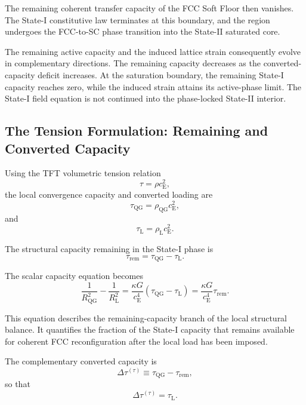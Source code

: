 The remaining coherent transfer capacity of the FCC Soft Floor then vanishes. The State-I constitutive law terminates at this boundary, and the region undergoes the FCC-to-SC phase transition into the State-II saturated core.

The remaining active capacity and the induced lattice strain consequently evolve in complementary directions. The remaining capacity decreases as the converted-capacity deficit increases. At the saturation boundary, the remaining State-I capacity reaches zero, while the induced strain attains its active-phase limit. The State-I field equation is not continued into the phase-locked State-II interior.

\subsection{The Tension Formulation: Remaining and Converted Capacity}

Using the TFT volumetric tension relation
\begin{equation}
    \tau = \rho c_{\mathrm{E}}^2,
\end{equation}
the local convergence capacity and converted loading are
\begin{equation}
    \tau_{\mathrm{QG}} = \rho_{\mathrm{QG}}c_{\mathrm{E}}^2,
\end{equation}
and
\begin{equation}
    \tau_{\mathrm{L}} = \rho_{\mathrm{L}}c_{\mathrm{E}}^2.
\end{equation}

The structural capacity remaining in the State-I phase is
\begin{equation}
    \tau_{\mathrm{rem}} = \tau_{\mathrm{QG}} - \tau_{\mathrm{L}}.
\end{equation}

The scalar capacity equation becomes
\begin{equation}
    \frac{1}{R_{\mathrm{QG}}^2} - \frac{1}{R_{\mathrm{L}}^2} = \frac{\kappa G}{c_{\mathrm{E}}^4} \left( \tau_{\mathrm{QG}} - \tau_{\mathrm{L}} \right) = \frac{\kappa G}{c_{\mathrm{E}}^4} \tau_{\mathrm{rem}}.
\end{equation}

This equation describes the remaining-capacity branch of the local structural balance. It quantifies the fraction of the State-I capacity that remains available for coherent FCC reconfiguration after the local load has been imposed.

The complementary converted capacity is
\begin{equation}
    \Delta\tau^{(\tau)} \equiv \tau_{\mathrm{QG}} - \tau_{\mathrm{rem}},
\end{equation}
so that
\begin{equation}
    \Delta\tau^{(\tau)} = \tau_{\mathrm{L}}.
\end{equation}

